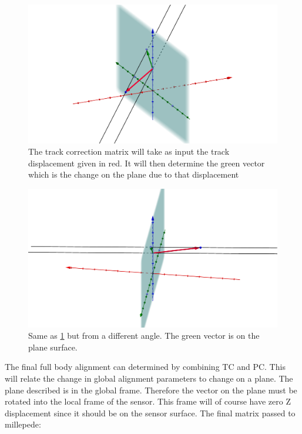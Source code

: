 \begin{figure}[H]
\centering
\includegraphics[width=1.0\linewidth]{figures/alignBigger.png}
\caption{The track correction matrix will take as input the track displacement given in red. It will then determine the green vector which is the change on the plane due to that displacement}
\label{fig:TC1}
\end{figure}

\begin{figure}[H]
\centering
\includegraphics[width=1.0\linewidth]{figures/alignmentBigger.png}
\caption{Same as \ref{fig:TC1} but from a different angle. The green vector is on the plane surface.}
\label{fig:TC2}
\end{figure}

The final full body alignment can determined by combining TC and PC. This will relate the change in global alignment parameters to change on a plane. The plane described is in the global frame. Therefore the vector on the plane must be rotated into the local frame of the sensor. This frame will of course have zero Z displacement since it should be on the sensor surface. The final matrix passed to millepede:

